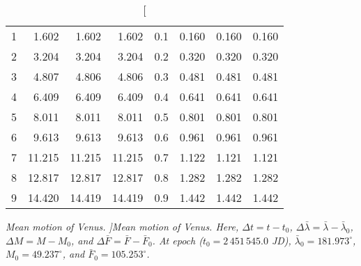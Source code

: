 \begin{table}
\begin{tabular}{rrrr|rrrr}
1 &   1.602 &   1.602 &   1.602 & 0.1 &   0.160 &   0.160 &   0.160\\
2 &   3.204 &   3.204 &   3.204 & 0.2 &   0.320 &   0.320 &   0.320\\
3 &   4.807 &   4.806 &   4.806 & 0.3 &   0.481 &   0.481 &   0.481\\
4 &   6.409 &   6.409 &   6.409 & 0.4 &   0.641 &   0.641 &   0.641\\
5 &   8.011 &   8.011 &   8.011 & 0.5 &   0.801 &   0.801 &   0.801\\
6 &   9.613 &   9.613 &   9.613 & 0.6 &   0.961 &   0.961 &   0.961\\
7 &  11.215 &  11.215 &  11.215 & 0.7 &   1.122 &   1.121 &   1.121\\
8 &  12.817 &  12.817 &  12.817 & 0.8 &   1.282 &   1.282 &   1.282\\
9 &  14.420 &  14.419 &  14.419 & 0.9 &   1.442 &   1.442 &   1.442\\
\end{tabular}
\caption[\em Mean motion of Venus. ]{\em Mean motion of Venus.  Here, $\Delta t = t-t_0$, $\Delta\bar{\lambda} = \bar{\lambda}-\bar{\lambda}_0$,  $\Delta M = M - M_0$, and $\Delta\bar{F} = \bar{F}-\bar{F}_0$.  At epoch  ($t_0 = 2\,451\,545.0$ JD), $\bar{\lambda}_0 = 181.973^\circ$, $M_0 = 49.237^\circ$, and
$\bar{F}_0 =105.253^\circ$. }\label{vt17}
\end{table}

